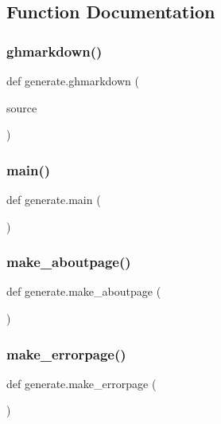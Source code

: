 \subsection{Function Documentation}
\mbox{\label{namespacegenerate_a7811fd26fa2e3aeec0e3d3851cdda546}} 
\subsubsection{\texorpdfstring{ghmarkdown()}{ghmarkdown()}}
{\footnotesize\ttfamily def generate.\+ghmarkdown (\begin{DoxyParamCaption}\item[{}]{source }\end{DoxyParamCaption})}

\mbox{\label{namespacegenerate_a7f0253880883fcd9badd715587a15668}} 
\subsubsection{\texorpdfstring{main()}{main()}}
{\footnotesize\ttfamily def generate.\+main (\begin{DoxyParamCaption}{ }\end{DoxyParamCaption})}

\mbox{\label{namespacegenerate_afa732feea0def89a5b9d1a2a6549ee60}} 
\subsubsection{\texorpdfstring{make\+\_\+aboutpage()}{make\_aboutpage()}}
{\footnotesize\ttfamily def generate.\+make\+\_\+aboutpage (\begin{DoxyParamCaption}{ }\end{DoxyParamCaption})}

\mbox{\label{namespacegenerate_a1c52bc54613c3a13c908bc65d7911b8e}} 
\subsubsection{\texorpdfstring{make\+\_\+errorpage()}{make\_errorpage()}}
{\footnotesize\ttfamily def generate.\+make\+\_\+errorpage (\begin{DoxyParamCaption}{ }\end{DoxyParamCaption})}

